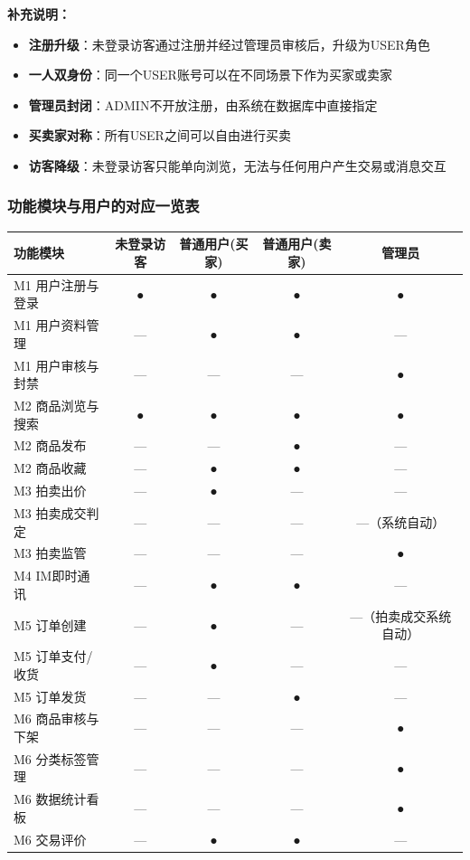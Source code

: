 \documentclass[12pt,a4paper]{ctexart}
\numberwithin{figure}{section}
\numberwithin{table}{section}
\begin{document}
\textbf{补充说明：}

\begin{itemize}
    \item \textbf{注册升级}：未登录访客通过注册并经过管理员审核后，升级为USER角色
    \item \textbf{一人双身份}：同一个USER账号可以在不同场景下作为买家或卖家
    \item \textbf{管理员封闭}：ADMIN不开放注册，由系统在数据库中直接指定
    \item \textbf{买卖家对称}：所有USER之间可以自由进行买卖
    \item \textbf{访客降级}：未登录访客只能单向浏览，无法与任何用户产生交易或消息交互
\end{itemize}

\subsubsection{功能模块与用户的对应一览表}

\begin{center}
\renewcommand{\arraystretch}{1.3}
\small
\begin{tabular}{|p{4.5cm}|c|c|c|c|}
\hline
\rowcolor{tableheader}
\textbf{功能模块} & \textbf{未登录访客} & \textbf{普通用户(买家)} & \textbf{普通用户(卖家)} & \textbf{管理员} \\
\hline
M1 用户注册与登录 & ● & ● & ● & ● \\
\hline
M1 用户资料管理 & --- & ● & ● & --- \\
\hline
M1 用户审核与封禁 & --- & --- & --- & ● \\
\hline
M2 商品浏览与搜索 & ● & ● & ● & ● \\
\hline
M2 商品发布 & --- & --- & ● & --- \\
\hline
M2 商品收藏 & --- & ● & ● & --- \\
\hline
M3 拍卖出价 & --- & ● & --- & --- \\
\hline
M3 拍卖成交判定 & --- & --- & --- & ---（系统自动） \\
\hline
M3 拍卖监管 & --- & --- & --- & ● \\
\hline
M4 IM即时通讯 & --- & ● & ● & --- \\
\hline
M5 订单创建 & --- & ● & --- & ---（拍卖成交系统自动） \\
\hline
M5 订单支付/收货 & --- & ● & --- & --- \\
\hline
M5 订单发货 & --- & --- & ● & --- \\
\hline
M6 商品审核与下架 & --- & --- & --- & ● \\
\hline
M6 分类标签管理 & --- & --- & --- & ● \\
\hline
M6 数据统计看板 & --- & --- & --- & ● \\
\hline
M6 交易评价 & --- & ● & ● & --- \\
\hline
\end{tabular}
\end{center}
\end{document}
